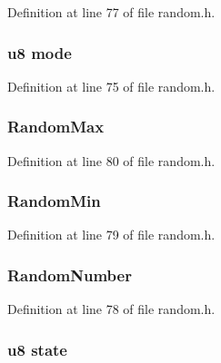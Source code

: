 \-Definition at line 77 of file random.\-h.

\hypertarget{structrandom_a7cea6ae40aa46b41e3806213a39718c6}{
\subsubsection[{mode}]{\setlength{\rightskip}{0pt plus 5cm}u8 {\bf mode}}}\label{structrandom_a7cea6ae40aa46b41e3806213a39718c6}


\-Definition at line 75 of file random.\-h.

\hypertarget{structrandom_aa6e314a3cc7476d1ffabba6f5d51c16b}{
\subsubsection[{\-Random\-Max}]{ {\bf \-Random\-Max}}}\label{structrandom_aa6e314a3cc7476d1ffabba6f5d51c16b}


\-Definition at line 80 of file random.\-h.

\hypertarget{structrandom_a0bdb70032c7bfe94635e1809fb1d811a}{
\subsubsection[{\-Random\-Min}]{ {\bf \-Random\-Min}}}\label{structrandom_a0bdb70032c7bfe94635e1809fb1d811a}


\-Definition at line 79 of file random.\-h.

\hypertarget{structrandom_a7f5042d7d2be5a48eb6f5d1a55367dc6}{
\subsubsection[{\-Random\-Number}]{ {\bf \-Random\-Number}}}\label{structrandom_a7f5042d7d2be5a48eb6f5d1a55367dc6}


\-Definition at line 78 of file random.\-h.

\hypertarget{structrandom_ad0bc4e4e6e6ffc52d9079b73afd73887}{
\subsubsection[{state}]{\setlength{\rightskip}{0pt plus 5cm}u8 {\bf state}}}\label{structrandom_ad0bc4e4e6e6ffc52d9079b73afd73887}



